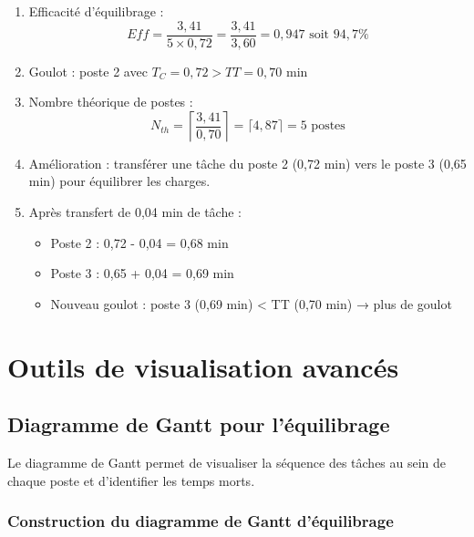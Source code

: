 \documentclass[12pt,a4paper]{article}
\begin{document}
\begin{center}
\begin{enumerate}
    \item Efficacité d'équilibrage :
    \[
    Eff = \frac{3,41}{5 \times 0,72} = \frac{3,41}{3,60} = 0,947 \text{ soit } 94,7\%
    \]
    
    \item Goulot : poste 2 avec \(T_C = 0,72 > TT = 0,70\) min
    
    \item Nombre théorique de postes :
    \[
    N_{th} = \left\lceil \frac{3,41}{0,70} \right\rceil = \lceil 4,87 \rceil = 5 \text{ postes}
    \]
    
    \item Amélioration : transférer une tâche du poste 2 (0,72 min) vers le poste 3 (0,65 min) pour équilibrer les charges.
    
    \item Après transfert de 0,04 min de tâche :
    \begin{itemize}
        \item Poste 2 : 0,72 - 0,04 = 0,68 min
        \item Poste 3 : 0,65 + 0,04 = 0,69 min
        \item Nouveau goulot : poste 3 (0,69 min) < TT (0,70 min) → plus de goulot
    \end{itemize}
\end{enumerate}


\section{Outils de visualisation avancés}

\subsection{Diagramme de Gantt pour l'équilibrage}

Le diagramme de Gantt permet de visualiser la séquence des tâches au sein de chaque poste et d'identifier les temps morts.

\subsubsection{Construction du diagramme de Gantt d'équilibrage}


\end{center}
\end{document}
